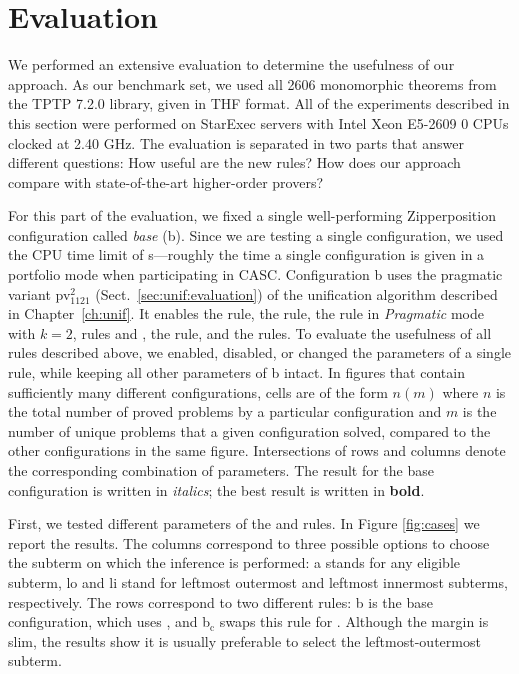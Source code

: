 \section{Evaluation} 
\label{sect:bool:eval}

We performed an extensive evaluation to determine the  usefulness of our approach. As
our benchmark set, we used all 2606 monomorphic theorems from the TPTP 7.2.0 library,
given in THF format. All of the experiments described in this section were
performed on StarExec \cite{sst-14-starexec} servers with Intel Xeon E5-2609 0 CPUs clocked at 2.40 GHz. The evaluation is separated in two parts that
answer different questions: How useful are the new rules? How 
does our approach compare with state-of-the-art higher-order provers?

For this part of the evaluation, we fixed a single well-perform\-ing Zipperposition configuration
called \emph{base} (b). Since we are testing a single configuration, we
used the CPU time limit of  s---roughly the time a single configuration is
given in a portfolio mode when participating in CASC. Configuration {b} uses the pragmatic variant
pv$_{1121}^{2}$ (Sect.~\ref{sec:unif:evaluation}) of the unification algorithm described in Chapter~\ref{ch:unif}. 
It enables the  rule,
the  rule, the  rule in \emph{Pragmatic} mode with $k=2$,
rules  and , the  rule, and the  rules. 
To evaluate the usefulness of
all rules described above, we enabled, disabled, or changed the
parameters of a single rule, while keeping all other parameters of b intact. 
In figures that contain sufficiently many different configurations, cells are of the form $n (m)$ where $n$ is the total
number of proved problems by a particular configuration and $m$ is the number of
unique problems that a given configuration solved, compared to the other
configurations in the same figure. Intersections of rows and columns
denote the corresponding combination of parameters.
The result for the base configuration is written in \emph{italics}; the best result
is written in \textbf{bold}.

First, we tested different parameters of the  and 
rules. In Figure \ref{fig:cases} we report the results. The columns correspond to
three possible options to choose the subterm on which the inference is performed:
{a} stands for any eligible subterm, {lo} and {li} stand
for leftmost outermost and leftmost innermost subterms, respectively. The rows
correspond to two different rules: 
{b} is the base configuration, which uses , and {b$_\text{c}$}
swaps this rule for . Although the margin is slim, the results show it is usually preferable to select the leftmost-outermost
subterm.

